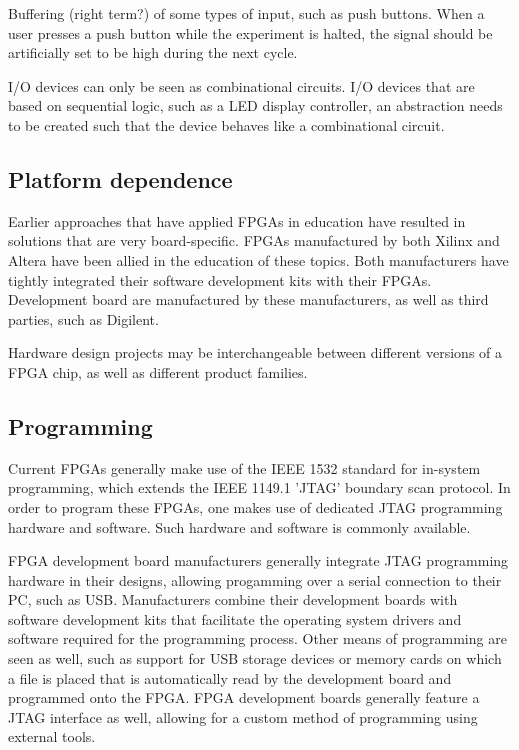 \documentclass[openright]{template/uva-bachelor-thesis}
\begin{document}
Buffering (right term?) of some types of input, such as push buttons. When a user presses a push button while the experiment is halted, the signal should be artificially set to be high during the next cycle.

I/O devices can only be seen as combinational circuits. I/O devices that are based on sequential logic, such as a LED display controller, an abstraction needs to be created such that the device behaves like a combinational circuit. 

\subsection{Platform dependence}
Earlier approaches that have applied FPGAs in education have resulted in solutions that are very board-specific. FPGAs manufactured by both Xilinx and Altera have been allied in the education of these topics. Both manufacturers have tightly integrated their software development kits with their FPGAs. Development board are manufactured by these manufacturers, as well as third parties, such as Digilent. 

Hardware design projects may be interchangeable between different versions of a FPGA chip, as well as different product families.

\subsection{Programming}
Current FPGAs generally make use of the IEEE 1532 standard for in-system programming, which extends the IEEE 1149.1 'JTAG' boundary scan protocol. In order to program these FPGAs, one makes use of dedicated JTAG programming hardware and software. Such hardware and software is commonly available.  

FPGA development board manufacturers generally integrate JTAG programming hardware in their designs, allowing progamming over a serial connection to their PC, such as USB. Manufacturers combine their development boards with software development kits that facilitate the operating system drivers and software required for the programming process. Other means of programming are seen as well, such as support for USB storage devices or memory cards on which a file is placed that is automatically read by the development board and programmed onto the FPGA. FPGA development boards generally feature a JTAG interface as well, allowing for a custom method of programming using external tools. 
\end{document}
